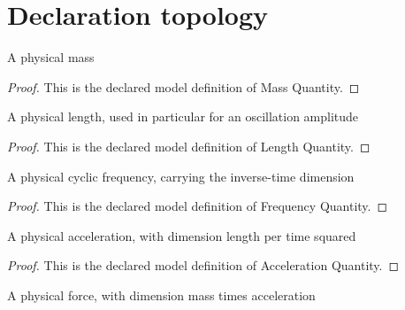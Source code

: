 \section{Declaration topology}
\begin{definition}
  \label{def:physics:phyx-mini-0231:phyxminiproblems-problemphyxmini0231-massquantity}
  A physical mass
\end{definition}
\begin{proof}
  This is the declared model definition of Mass Quantity.
\end{proof}
\begin{definition}
  \label{def:physics:phyx-mini-0231:phyxminiproblems-problemphyxmini0231-lengthquantity}
  A physical length, used in particular for an oscillation amplitude
\end{definition}
\begin{proof}
  This is the declared model definition of Length Quantity.
\end{proof}
\begin{definition}
  \label{def:physics:phyx-mini-0231:phyxminiproblems-problemphyxmini0231-frequencyquantity}
  A physical cyclic frequency, carrying the inverse-time dimension
\end{definition}
\begin{proof}
  This is the declared model definition of Frequency Quantity.
\end{proof}
\begin{definition}
  \label{def:physics:phyx-mini-0231:phyxminiproblems-problemphyxmini0231-accelerationquantity}
  A physical acceleration, with dimension length per time squared
\end{definition}
\begin{proof}
  This is the declared model definition of Acceleration Quantity.
\end{proof}
\begin{definition}
  \label{def:physics:phyx-mini-0231:phyxminiproblems-problemphyxmini0231-forcequantity}
  A physical force, with dimension mass times acceleration
\end{definition}
